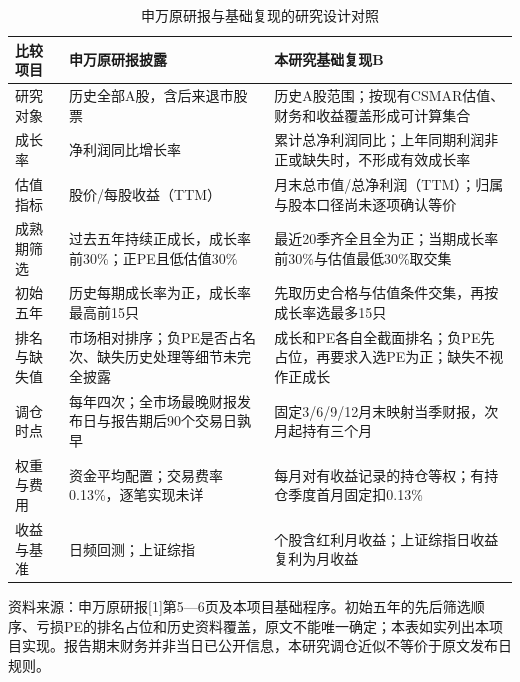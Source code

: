 \begin{table}[htbp]
\centering
\caption{申万原研报与基础复现的研究设计对照}
\renewcommand{\arraystretch}{1.18}
\small
\setlength{\tabcolsep}{4.5pt}
\begin{tabularx}{\textwidth}{@{}p{2.45cm}LL@{}}
\toprule
比较项目 & 申万原研报披露 & 本研究基础复现B \\
\midrule
研究对象 & 历史全部A股，含后来退市股票 & 历史A股范围；按现有CSMAR估值、财务和收益覆盖形成可计算集合 \\
成长率 & 净利润同比增长率 & 累计总净利润同比；上年同期利润非正或缺失时，不形成有效成长率 \\
估值指标 & 股价/每股收益（TTM） & 月末总市值/总净利润（TTM）；归属与股本口径尚未逐项确认等价 \\
成熟期筛选 & 过去五年持续正成长，成长率前30\%；正PE且低估值30\% & 最近20季齐全且全为正；当期成长率前30\%与估值最低30\%取交集 \\
初始五年 & 历史每期成长率为正，成长率最高前15只 & 先取历史合格与估值条件交集，再按成长率选最多15只 \\
排名与缺失值 & 市场相对排序；负PE是否占名次、缺失历史处理等细节未完全披露 & 成长和PE各自全截面排名；负PE先占位，再要求入选PE为正；缺失不视作正成长 \\
调仓时点 & 每年四次；全市场最晚财报发布日与报告期后90个交易日孰早 & 固定3/6/9/12月末映射当季财报，次月起持有三个月 \\
权重与费用 & 资金平均配置；交易费率0.13\%，逐笔实现未详 & 每月对有收益记录的持仓等权；有持仓季度首月固定扣0.13\% \\
收益与基准 & 日频回测；上证综指 & 个股含红利月收益；上证综指日收益复利为月收益 \\
\bottomrule
\end{tabularx}
\par\smallskip
\begin{minipage}{\textwidth}\small 资料来源：申万原研报[1]第5—6页及本项目基础程序。初始五年的先后筛选顺序、亏损PE的排名占位和历史资料覆盖，原文不能唯一确定；本表如实列出本项目实现。报告期末财务并非当日已公开信息，本研究调仓近似不等价于原文发布日规则。\end{minipage}
\end{table}

